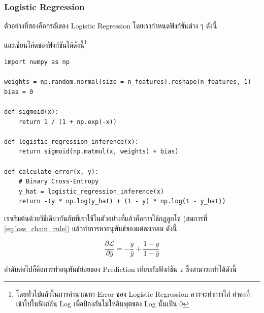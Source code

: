 \subsubsection{Logistic Regression}

ตัวอย่างที่สองคือกรณีของ Logistic Regression โดยเรากำหนดฟังก์ชันต่าง ๆ ดังนี้


\noindent และเขียนโค้ดของฟังก์ชันได้ดังนี้\footnote{โดยทั่วไปแล้วในการคำนวณหา Error ของ Logistic Regression ควรจะทำการใส่%
ค่าคงที่เข้าไปในฟังก์ชัน Log เพื่อป้องกันไม่ให้อินพุตของ Log นั้นเป็น 0}

\begin{lstlisting}[style=MyPython]
import numpy as np

weights = np.random.normal(size = n_features).reshape(n_features, 1)
bias = 0

def sigmoid(x):
    return 1 / (1 + np.exp(-x))

def logistic_regression_inference(x):
    return sigmoid(np.matmul(x, weights) + bias)

def calculate_error(x, y):
    # Binary Cross-Entropy
    y_hat = logistic_regression_inference(x)
    return -(y * np.log(y_hat) + (1 - y) * np.log(1 - y_hat))
\end{lstlisting}

เราเริ่มต้นด้วยวิธีเดียวกันกับที่เราใช้ในตัวอย่างที่แล้วคือการใช้กฎลูกโซ่ (สมการที่ \ref{eq:loss_chain_rule}) แล้วทำการหาอนุพันธ์ของแต่ละเทอม
ดังนี้

\begin{equation}
    \frac{\partial \mathcal{L}}{\partial \hat{y}} = -\frac{y}{\hat{y}} + \frac{1-y}{1-\hat{y}}
\end{equation}

ลำดับต่อไปก็คือการทำอนุพันธ์ย่อยของ Prediction เทียบกับฟังก์ชัน $z$ ซึ่งสามารถทำได้ดังนี้

